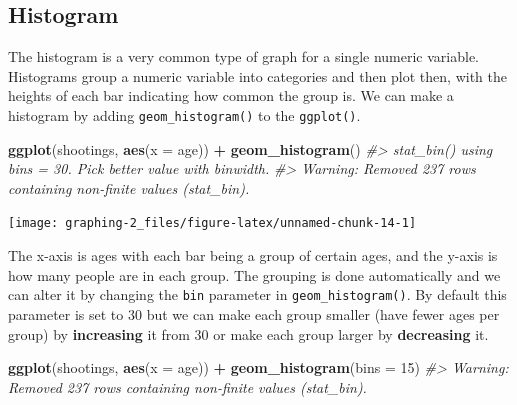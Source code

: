\documentclass[
  12pt,
]{book}
\newenvironment{Shaded}{\begin{snugshade}}{\end{snugshade}}
\newcommand{\CommentTok}[1]{\textcolor[rgb]{0.56,0.35,0.01}{\textit{#1}}}
\newcommand{\DataTypeTok}[1]{\textcolor[rgb]{0.13,0.29,0.53}{#1}}
\newcommand{\DecValTok}[1]{\textcolor[rgb]{0.00,0.00,0.81}{#1}}
\newcommand{\KeywordTok}[1]{\textcolor[rgb]{0.13,0.29,0.53}{\textbf{#1}}}
\newcommand{\NormalTok}[1]{#1}
\newcommand{\OperatorTok}[1]{\textcolor[rgb]{0.81,0.36,0.00}{\textbf{#1}}}
\newcommand{\StringTok}[1]{\textcolor[rgb]{0.31,0.60,0.02}{#1}}
\begin{document}
\hypertarget{histogram}{%
\subsection{Histogram}\label{histogram}}

The histogram is a very common type of graph for a single numeric variable. Histograms group a numeric variable into categories and then plot then, with the heights of each bar indicating how common the group is. We can make a histogram by adding \texttt{geom\_histogram()} to the \texttt{ggplot()}.

\begin{Shaded}
\begin{Highlighting}[]
\KeywordTok{ggplot}\NormalTok{(shootings, }\KeywordTok{aes}\NormalTok{(}\DataTypeTok{x =}\NormalTok{ age)) }\OperatorTok{+}\StringTok{ }
\StringTok{  }\KeywordTok{geom\_histogram}\NormalTok{()}
\CommentTok{\#> \textasciigrave{}stat\_bin()\textasciigrave{} using \textasciigrave{}bins = 30\textasciigrave{}. Pick better value with \textasciigrave{}binwidth\textasciigrave{}.}
\CommentTok{\#> Warning: Removed 237 rows containing non{-}finite values (stat\_bin).}
\end{Highlighting}
\end{Shaded}

\begin{center}\texttt{[image: graphing-2\_files/figure-latex/unnamed-chunk-14-1]} \end{center}

The x-axis is ages with each bar being a group of certain ages, and the y-axis is how many people are in each group. The grouping is done automatically and we can alter it by changing the \texttt{bin} parameter in \texttt{geom\_histogram()}. By default this parameter is set to 30 but we can make each group smaller (have fewer ages per group) by \textbf{increasing} it from 30 or make each group larger by \textbf{decreasing} it.

\begin{Shaded}
\begin{Highlighting}[]
\KeywordTok{ggplot}\NormalTok{(shootings, }\KeywordTok{aes}\NormalTok{(}\DataTypeTok{x =}\NormalTok{ age)) }\OperatorTok{+}\StringTok{ }
\StringTok{  }\KeywordTok{geom\_histogram}\NormalTok{(}\DataTypeTok{bins =} \DecValTok{15}\NormalTok{)}
\CommentTok{\#> Warning: Removed 237 rows containing non{-}finite values (stat\_bin).}
\end{Highlighting}
\end{Shaded}
\end{document}

